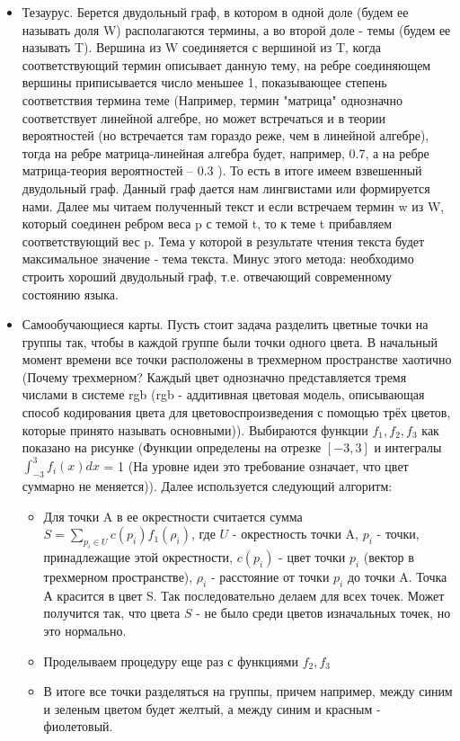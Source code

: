 \begin {itemize}
\item Тезаурус. Берется двудольный граф, в котором в одной доле (будем ее называть доля  W) располагаются термины, а во второй доле - темы (будем ее называть T). Вершина из W соединяется с вершиной из T, когда соответствующий термин описывает данную тему, на ребре соединяющем вершины приписывается число меньшее 1, показывающее степень соответствия термина теме (Например, термин "матрица" однозначно соответствует линейной алгебре, но может встречаться и в теории вероятностей (но встречается там гораздо реже, чем в линейной алгебре), тогда на ребре матрица-линейная алгебра будет, например, 0.7, а на ребре матрица-теория вероятностей -- 0.3 ). То есть в итоге имеем взвешенный двудольный граф. Данный граф дается нам лингвистами или формируется нами. Далее мы читаем полученный текст и если встречаем термин w из W, который соединен ребром веса p с темой t, то к теме t  прибавляем соответствующий вес p. Тема у которой в результате чтения текста будет максимальное значение - тема текста. Минус этого метода: необходимо строить хороший двудольный граф, т.е. отвечающий современному состоянию языка.
\item Самообучающиеся карты.
Пусть стоит задача разделить цветные точки на группы так, чтобы в каждой группе были точки одного цвета. В начальный момент времени все точки расположены в трехмерном пространстве хаотично (Почему трехмерном? Каждый цвет однозначно представляется тремя числами в системе rgb (rgb - аддитивная цветовая модель, описывающая способ кодирования цвета для цветовоспроизведения с помощью трёх цветов, которые принято называть основными)). Выбираются функции $f_1, f_2, f_3$ как показано на рисунке (Функции определены на отрезке $[-3, 3]$ и интегралы $\int_{-3}^3 f_i (x) dx$ = 1 (На уровне идеи это требование означает, что цвет суммарно не меняется)).
Далее используется следующий алгоритм:
\begin {itemize}
\item Для точки A в ее окрестности считается сумма $S = \sum_{p_i \in U} c (p_i) f_1 (\rho_i)$, где $U$ - окрестность точки A, $p_i$ - точки, принадлежащие этой окрестности, $c (p_i)$ - цвет точки $p_i$ (вектор в трехмерном пространстве), $\rho_i$ - расстояние от точки $p_i$ до точки A. Точка А красится в цвет S. Так последовательно делаем для всех точек. Может получится так, что цвета $S$ - не было среди цветов изначальных точек, но это нормально.
\item Проделываем процедуру еще раз с функциями $f_2, f_3$
\item В итоге все точки разделяться на группы, причем например, между синим и зеленым цветом будет желтый, а между синим и красным - фиолетовый.
\end {itemize}


\end{itemize}
